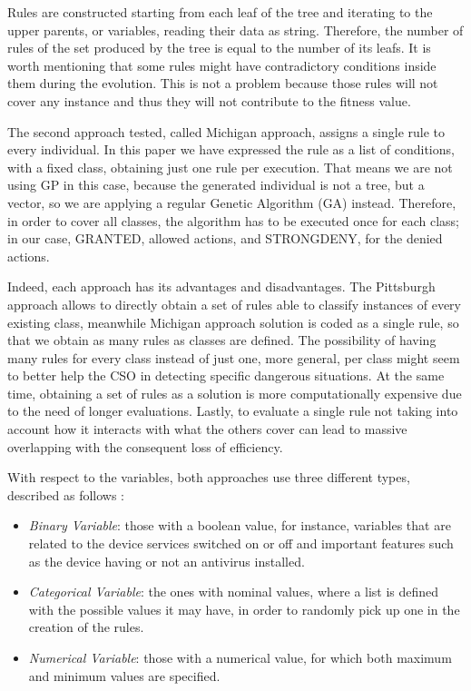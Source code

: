 \documentclass[runningheads]{llncs}
\begin{document}
Rules are constructed starting from each leaf of the tree and iterating to the upper parents, or variables, reading their data as string. Therefore, the number of rules of the set produced by the tree is equal to the number of its leafs. It is worth mentioning that some rules might have contradictory conditions inside them during the evolution. This is not a problem because those rules will not cover any instance and thus they will not contribute to the fitness value. 

The second approach tested, called Michigan approach, assigns a single
rule to every individual. In this paper we have expressed the rule as
a list of conditions, with a fixed class, obtaining just one rule per
execution. That means we are not using GP in this case, because the
generated individual is not a tree, but a vector, so we are applying a
regular Genetic Algorithm (GA) instead. Therefore, in order to cover
all classes, the algorithm has to be executed once for each class; in
our case, GRANTED, allowed actions, and STRONGDENY, for the denied
actions. 

Indeed, each approach has its advantages and disadvantages. The Pittsburgh approach allows to directly obtain a set of rules able to classify instances of every existing class, meanwhile Michigan approach solution is coded as a single rule, so that we obtain as many rules as classes are defined. The possibility of having many rules for every class instead of just one, more general, per class might seem to better help the CSO in detecting specific dangerous situations.
At the same time, obtaining a set of rules as a solution is more
computationally expensive due to the need of longer
evaluations. Lastly, to evaluate a single rule not taking into account
how it interacts with what the others cover \cite{freitas2002data}
can lead to massive overlapping with the consequent loss of
efficiency. 

With respect to the variables, both approaches use three different types, 
described as follows \cite{witten2005data}:

\begin{itemize}
\item {\em Binary Variable}: those with a boolean value, for instance, variables that are related to the device services switched on or off and important features such as the device having or not an antivirus installed. 
\item {\em Categorical Variable}: the ones with nominal values, where a list is defined with the possible values it may have, in order to randomly pick up one in the creation of the rules. 
\item {\em Numerical Variable}: those with a numerical value, for which both maximum and minimum values are specified. 

\end{itemize}
\end{document}
